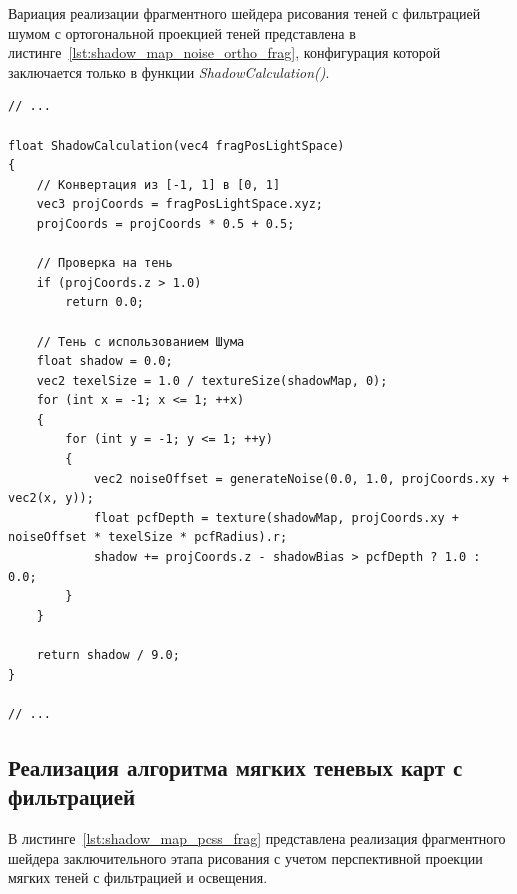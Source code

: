 Вариация реализации фрагментного шейдера рисования теней с
фильтрацией шумом с ортогональной проекцией теней представлена в
листинге~\ref{lst:shadow_map_noise_ortho_frag}, конфигурация которой
заключается только в функции \textit{ShadowCalculation()}.

\begin{center}
\captionsetup{justification=centering, singlelinecheck=off}
\begin{lstlisting}[label=lst:shadow_map_noise_ortho_frag, caption=Фрагментный шейдер с учетом ортогонального проецирония теней]
// ...

float ShadowCalculation(vec4 fragPosLightSpace)
{
    // Конвертация из [-1, 1] в [0, 1]
    vec3 projCoords = fragPosLightSpace.xyz;
    projCoords = projCoords * 0.5 + 0.5;

    // Проверка на тень
    if (projCoords.z > 1.0)
        return 0.0;
    
    // Тень с использованием Шума
    float shadow = 0.0;
    vec2 texelSize = 1.0 / textureSize(shadowMap, 0);
    for (int x = -1; x <= 1; ++x)
    {
        for (int y = -1; y <= 1; ++y)
        {
            vec2 noiseOffset = generateNoise(0.0, 1.0, projCoords.xy + vec2(x, y));
            float pcfDepth = texture(shadowMap, projCoords.xy + noiseOffset * texelSize * pcfRadius).r;
            shadow += projCoords.z - shadowBias > pcfDepth ? 1.0 : 0.0;
        }
    }

    return shadow / 9.0;
}

// ...
\end{lstlisting}
\end{center}

\subsection{Реализация алгоритма мягких теневых карт с фильтрацией}

В листинге~\ref{lst:shadow_map_pcss_frag} представлена реализация фрагментного шейдера заключительного
этапа рисования с учетом перспективной проекции мягких теней с фильтрацией и освещения.

